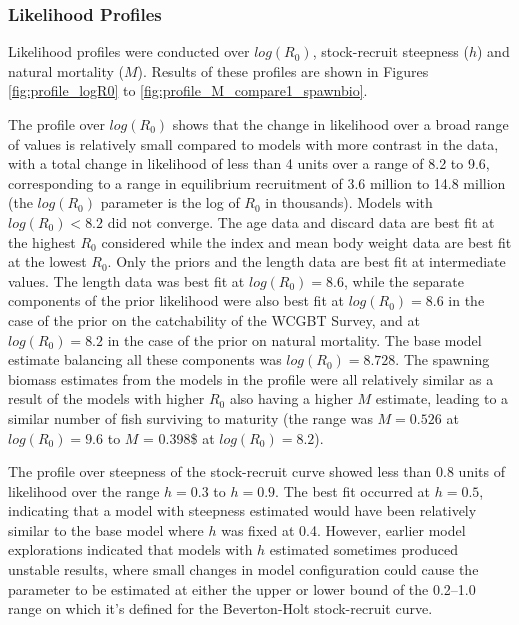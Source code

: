 \documentclass[12pt,]{article}
\begin{document}
\hypertarget{likelihood-profiles}{%
\subsubsection{Likelihood Profiles}\label{likelihood-profiles}}

Likelihood profiles were conducted over \(log(R_0)\), stock-recruit
steepness (\(h\)) and natural mortality (\(M\)). Results of these
profiles are shown in Figures \ref{fig:profile_logR0} to
\ref{fig:profile_M_compare1_spawnbio}.

The profile over \(log(R_0)\) shows that the change in likelihood over a
broad range of values is relatively small compared to models with more
contrast in the data, with a total change in likelihood of less than 4
units over a range of 8.2 to 9.6, corresponding to a range in
equilibrium recruitment of 3.6 million to 14.8 million (the \(log(R_0)\)
parameter is the log of \(R_0\) in thousands). Models with
\(log(R_0) < 8.2\) did not converge. The age data and discard data are
best fit at the highest \(R_0\) considered while the index and mean body
weight data are best fit at the lowest \(R_0\). Only the priors and the
length data are best fit at intermediate values. The length data was
best fit at \(log(R_0) = 8.6\), while the separate components of the
prior likelihood were also best fit at \(log(R_0) = 8.6\) in the case of
the prior on the catchability of the WCGBT Survey, and at
\(log(R_0) = 8.2\) in the case of the prior on natural mortality. The
base model estimate balancing all these components was
\(log(R_0) = 8.728\). The spawning biomass estimates from the models in
the profile were all relatively similar as a result of the models with
higher \(R_0\) also having a higher \(M\) estimate, leading to a similar
number of fish surviving to maturity (the range was \(M = 0.526\) at
\(log(R_0) = 9.6\) to \(M\) = 0.398\$ at \(log(R_0) = 8.2\)).

The profile over steepness of the stock-recruit curve showed less than
0.8 units of likelihood over the range \(h = 0.3\) to \(h = 0.9\). The
best fit occurred at \(h = 0.5\), indicating that a model with steepness
estimated would have been relatively similar to the base model where
\(h\) was fixed at 0.4. However, earlier model explorations indicated
that models with \(h\) estimated sometimes produced unstable results,
where small changes in model configuration could cause the parameter to
be estimated at either the upper or lower bound of the 0.2--1.0 range on
which it's defined for the Beverton-Holt stock-recruit curve.
\end{document}

